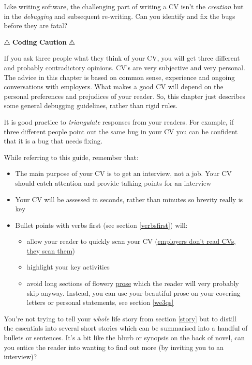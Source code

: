 \documentclass[
]{book}
\providecommand{\tightlist}{%
  \setlength{\itemsep}{0pt}\setlength{\parskip}{0pt}}
\begin{document}
Like writing software, the challenging part of writing a CV isn't the \emph{creation} but in the \emph{debugging} and subsequent re-writing. Can you identify and fix the bugs before they are fatal?

⚠️ \textbf{Coding Caution} ⚠️

If you ask three people what they think of your CV, you will get three different and probably contradictory opinions. CV's are very subjective and very personal. The advice in this chapter is based on common sense, experience and ongoing conversations with employers. What makes a good CV will depend on the personal preferences and prejudices of your reader. So, this chapter just describes some general debugging guidelines, rather than rigid rules.

It is good practice to \emph{triangulate} responses from your readers. For example, if three different people point out the same bug in your CV you can be confident that it is a bug that needs fixing.

While referring to this guide, remember that:

\begin{itemize}
\tightlist
\item
  The main purpose of your CV is to get an interview, not a job. Your CV should catch attention and provide talking points for an interview
\item
  Your CV will be assessed in seconds, rather than minutes so brevity really is key
\item
  Bullet points with verbs first (see section \ref{verbsfirst}) will:

  \begin{itemize}
  \tightlist
  \item
    allow your reader to quickly scan your CV (\href{https://readabilityguidelines.co.uk/content-design/how-people-read/}{employers don't read CVs, they scan them}) \citep{scanning}
  \item
    highlight your key activities
  \item
    avoid long sections of flowery \href{https://en.wikipedia.org/wiki/Prose}{prose} which the reader will very probably skip anyway. Instead, you can use your beautiful prose on your covering letters or personal statements, see section \ref{we3qs}
  \end{itemize}
\end{itemize}

You're not trying to tell your \emph{whole} life story from section \ref{story} but to distill the essentials into several short stories which can be summarised into a handful of bullets or sentences. It's a bit like the \href{https://en.wikipedia.org/wiki/Blurb}{blurb} or synopsis on the back of novel, can you entice the reader into wanting to find out more (by inviting you to an interview)?
\end{document}
